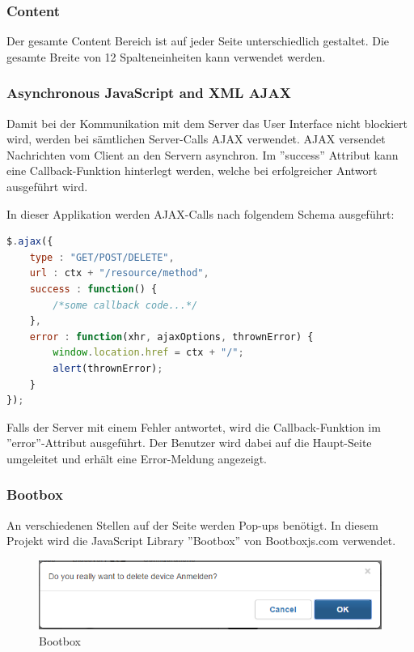 \subsubsection{Content}
Der gesamte Content Bereich ist auf jeder Seite unterschiedlich gestaltet. Die gesamte Breite von 12 Spalteneinheiten kann verwendet werden.
 \newpage

\subsubsection{Asynchronous JavaScript and XML AJAX}
Damit bei der Kommunikation mit dem Server das User Interface nicht blockiert wird, werden bei sämtlichen Server-Calls AJAX verwendet. AJAX versendet Nachrichten vom Client an den Servern asynchron. Im ''success'' Attribut kann eine Callback-Funktion hinterlegt werden, welche bei erfolgreicher Antwort ausgeführt wird.

In dieser Applikation werden AJAX-Calls nach folgendem Schema ausgeführt:
\begin{lstlisting}[language=js]
$.ajax({
	type : "GET/POST/DELETE",
	url : ctx + "/resource/method",
	success : function() {
		/*some callback code...*/
	},
	error : function(xhr, ajaxOptions, thrownError) {
		window.location.href = ctx + "/";
		alert(thrownError);
	}
});
\end{lstlisting}

Falls der Server mit einem Fehler antwortet, wird die Callback-Funktion im ''error''-Attribut ausgeführt. Der Benutzer wird dabei auf die Haupt-Seite umgeleitet und erhält eine Error-Meldung angezeigt.

\subsubsection{Bootbox}
An verschiedenen Stellen auf der Seite werden Pop-ups benötigt. In diesem Projekt wird die JavaScript Library ''Bootbox'' von Bootboxjs.com verwendet.

\begin{figure}[H]
\centering
\includegraphics[scale=0.9]{../04_Realisierung/images/userinterface/bootbox.png}
\caption{Bootbox}
\end{figure}

